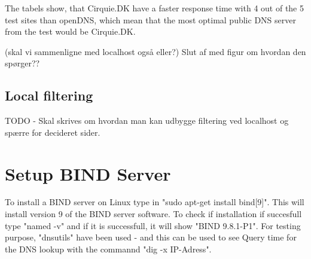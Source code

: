 \documentclass[Preamble]{subfiles}
\begin{document}
The tabels show, that Cirquie.DK have a faster response time with 4 out of the 5 test sites than openDNS, which mean that the most optimal public DNS server from the test would be Cirquie.DK. 

(skal vi sammenligne med localhost også eller?)
Slut af med figur om hvordan den spørger??

\subsection{Local filtering}
TODO - Skal skrives om hvordan man kan udbygge filtering ved localhost og spærre for decideret sider. 

\section{Setup BIND Server}
To install a BIND server on Linux type in "sudo apt-get install bind[9]". This will install version 9 of the BIND server software. To check if installation if succesfull type "named -v" and if it is successfull, it will show "BIND 9.8.1-P1". For testing purpose, "dnsutils" have been used - and this can be used to see Query time for the DNS lookup with the commannd "dig -x IP-Adress". 
\end{document}
